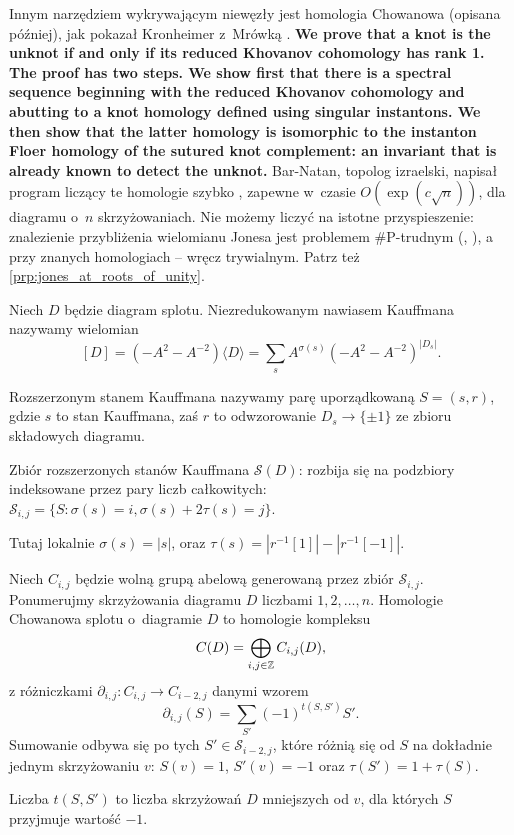 Innym narzędziem wykrywającym niewęzły jest homologia Chowanowa (opisana później),
jak pokazał Kronheimer z~Mrówką \cite{kronheimer11}.
\textbf{We prove that a knot is the unknot if and only if its reduced Khovanov cohomology has rank 1. The proof has two steps. We show first that there is a spectral sequence beginning with the reduced Khovanov cohomology and abutting to a knot homology defined using singular instantons. We then show that the latter homology is isomorphic to the instanton Floer homology of the sutured knot complement: an invariant that is already known to detect the unknot.}
Bar-Natan, topolog izraelski, napisał program liczący te homologie szybko \cite{barnatan07},
zapewne w~czasie $O(\exp(c \sqrt n))$, dla diagramu o~$n$ skrzyżowaniach.
Nie możemy liczyć na istotne przyspieszenie:
znalezienie przybliżenia wielomianu Jonesa jest problemem \#P-trudnym (\cite{kuperberg15}, \cite{vertigan05}),
a przy znanych homologiach -- wręcz trywialnym.
Patrz też \ref{prp:jones_at_roots_of_unity}.

\begin{definition}
    Niech $D$ będzie diagram splotu.
    Niezredukowanym nawiasem Kauffmana nazywamy wielomian
    \[
        [D] = (-A^2 - A^{-2}) \langle D \rangle = \sum_s A^{\sigma(s)} (-A^2 - A^{-2})^{|D_s|}.
    \]
\end{definition}

\begin{definition}
    Rozszerzonym stanem Kauffmana nazywamy parę uporządkowaną $S = (s, r)$,
    gdzie $s$ to stan Kauffmana,
    zaś $r$ to odwzorowanie $D_s \to \{\pm 1\}$ ze zbioru składowych diagramu.
\end{definition}

\begin{definition}
    Zbiór rozszerzonych stanów Kauffmana $\mathcal S(D)$:
    rozbija się na podzbiory indeksowane przez pary liczb całkowitych:
    $\mathcal S_{i, j} = \{S : \sigma(s) = i, \sigma(s) + 2 \tau(s) = j\}$.
\end{definition}

Tutaj lokalnie $\sigma(s) = |s|$, oraz $\tau(s) = |r^{-1}[1]| - |r^{-1}[-1]|$.


\begin{definition}
    Niech $C_{i, j}$ będzie wolną grupą abelową generowaną przez zbiór $\mathcal S_{i, j}$.
    Ponumerujmy skrzyżowania diagramu $D$ liczbami $1, 2, \ldots, n$.
    Homologie Chowanowa splotu o~diagramie $D$ to homologie kompleksu
    \[
        C(D) = \bigoplus_{i, j \in \mathbb Z} C_{i, j}(D),
    \]
    z różniczkami $\partial_{i, j} \colon C_{i,j} \to C_{i-2, j}$ danymi wzorem
    \[
        \partial_{i, j}(S) = \sum_{S'} (-1)^{t(S, S')}  S'.
    \]
    Sumowanie odbywa się po tych $S' \in \mathcal S_{i-2, j}$,
    które różnią się od $S$ na dokładnie jednym skrzyżowaniu $v$:
    $S(v) = 1$, $S'(v) = -1$ oraz $\tau(S') = 1 + \tau (S)$.

    Liczba $t(S, S')$ to liczba skrzyżowań $D$ mniejszych od $v$, dla których $S$ przyjmuje wartość $-1$.
\end{definition}

